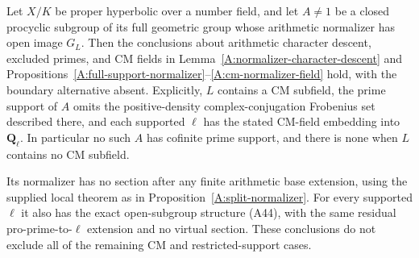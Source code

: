 \begin{proposition}
\label{A:proper-normalizer-restrictions}
Let $X/K$ be proper hyperbolic over a number
field, and let $A\ne1$ be a closed procyclic
subgroup of its full geometric group whose
arithmetic normalizer has open image $G_L$.
Then the conclusions about arithmetic character
descent, excluded primes, and CM fields in
Lemma~\ref{A:normalizer-character-descent} and
Propositions~\ref{A:full-support-normalizer}--\ref{A:cm-normalizer-field}
hold, with the boundary alternative absent.
Explicitly, $L$ contains a CM subfield, the
prime support of $A$ omits the positive-density
complex-conjugation Frobenius set described
there, and each supported $\ell$ has the
stated CM-field embedding into $\mathbf Q_\ell$.
In particular no such $A$ has cofinite prime
support, and there is none when $L$ contains
no CM subfield.

Its normalizer has no section after any finite
arithmetic base extension, using the supplied
local theorem as in Proposition~\ref{A:split-normalizer}.
For every supported $\ell$ it also has the
exact open-subgroup structure (A44), with
the same residual pro-prime-to-$\ell$
extension and no virtual section.
These conclusions do not exclude all of
the remaining CM and restricted-support cases.
\end{proposition}
